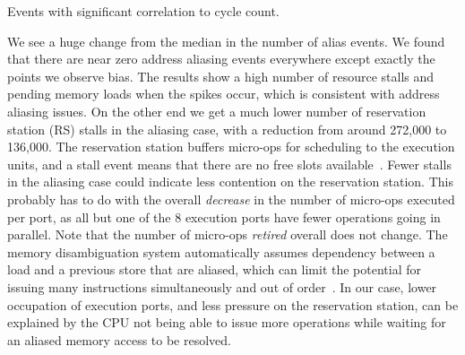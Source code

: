 \documentclass[10pt, conference, compsocconf]{IEEEtran}
\newcommand{\perfctr}[1] {
  {\lowercase{#1}}
}
\begin{document}
\begin{table}
  \caption{Events with significant correlation to cycle count.\label{tab:loopcorrelation}}
  \pgfplotstabletypeset[
    int detect, %
    col sep=comma,
    columns={Performance counter, Median, [index]3}, %
    column type=r,
    columns/Performance counter/.style={
      string type, 
      column type=l,
      column type/.add={|}{},
      postproc cell content/.append code={
        \pgfkeysalso{@cell content=\perfctr{##1}}
      }
    },
    every head row/.style={
      output empty row,
      before row={\hline
        Performance counter & Median & Spike \\ %
      },
      after row=\hline\hline
    },
    every last row/.style={after row=\hline},
    every last column/.style={column type/.add={}{|}}
  ]{bin/microkernel-comparison-haswell.csv}
\end{table}

We see a huge change from the median in the number of alias events. 
We found that there are near zero address aliasing events everywhere except exactly the points we observe bias. 
The results show a high number of resource stalls and pending memory loads when the spikes occur, which is consistent with address aliasing issues.
On the other end we get a much lower number of reservation station (RS) stalls in the aliasing case, with a reduction from around 272,000 to 136,000.
The reservation station buffers micro-ops for scheduling to the execution units, and a stall event means that there are no free slots available~\cite[Table 19-2]{Volume3B}.
Fewer stalls in the aliasing case could indicate less contention on the reservation station.
This probably has to do with the overall \emph{decrease} in the number of micro-ops executed per port, as all but one of the 8 execution ports have fewer operations going in parallel.
Note that the number of micro-ops \emph{retired} overall does not change.
The memory disambiguation system automatically assumes dependency between a load and a previous store that are aliased, which can limit the potential for issuing many instructions simultaneously and out of order~\cite[Page 2-20]{OptimizationManual}.
In our case, lower occupation of execution ports, and less pressure on the reservation station, can be explained by the CPU not being able to issue more operations while waiting for an aliased memory access to be resolved.
\end{document}
